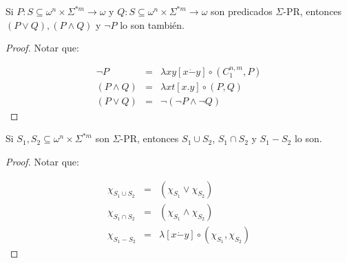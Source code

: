   \begin{lemma}
    \par Si $P: S \subseteq \omega^{n} \times \Sigma^{\ast m} \rightarrow \omega$ y $Q: S \subseteq \omega^{n} \times
    \Sigma^{\ast m} \rightarrow \omega$ son predicados $\Sigma$-PR, entonces $(P \vee Q), (P \wedge Q)$ y $\neg P$ lo
    son también.
  \end{lemma}
  \begin{proof}
    \par Notar que:

    \begin{eqnarray}
      \nonumber \neg P &=& \lambda xy \left[x \dot{-} y\right] \circ (C_{1}^{n, m}, P) \\
      \nonumber (P \wedge Q) &=& \lambda xt \left[x.y\right] \circ (P, Q) \\
      \nonumber (P \vee Q) &=& \neg (\neg P \wedge \neg Q)
    \end{eqnarray}
  \end{proof}

  \begin{lemma}
    \par Si $S_{1}, S_{2} \subseteq \omega^{n} \times \Sigma^{\ast m}$ son $\Sigma$-PR, entonces $S_{1} \cup S_{2}$,
    $S_{1} \cap S_{2}$ y $S_{1} - S_{2}$ lo son.
  \end{lemma}
  \begin{proof}
    \par Notar que:

    \begin{eqnarray}
      \nonumber \chi_{S_{1} \cup S_{2}} &=& (\chi_{S_{1}} \vee \chi_{S_{2}}) \\
      \nonumber \chi_{S_{1} \cap S_{2}} &=& (\chi_{S_{1}} \wedge \chi_{S_{2}}) \\
      \nonumber \chi_{S_{1} - S_{2}} &=& \lambda \left[x \dot{-} y\right] \circ (\chi_{S_{1}}, \chi_{S_{2}})
    \end{eqnarray}
  \end{proof}

